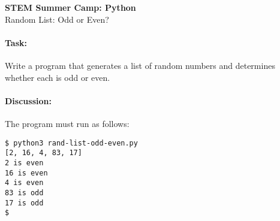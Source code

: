 \documentclass[11pt]{article}
\begin{document}
    \begin{center}

        \large\textbf{STEM Summer Camp: Python} \\
        Random List: Odd or Even? \\

    \end{center}

    \paragraph{Task:} Write a program that generates a list of random
    numbers and determines whether each is odd or even.  
    
    \paragraph{Discussion:} The program must run as follows:
    
    \vspace{1.5em}

\begin{verbatim}
$ python3 rand-list-odd-even.py
[2, 16, 4, 83, 17]
2 is even
16 is even
4 is even
83 is odd
17 is odd
$
\end{verbatim}
    
\end{document}
